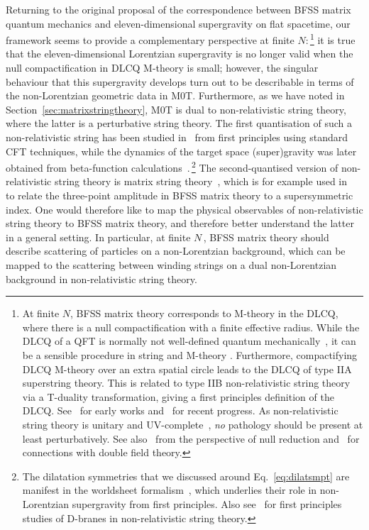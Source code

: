 \documentclass[11pt]{article}
\renewcommand{\emph}[1]{\textit{#1}}
\begin{document}
Returning to the original proposal of the correspondence between BFSS matrix quantum mechanics and eleven-dimensional supergravity on flat spacetime, our framework seems to provide a complementary perspective at finite $N$:\,\footnote{At finite $N$, BFSS matrix theory corresponds to M-theory in the DLCQ, where there is a null compactification with a finite effective radius. While the DLCQ of a QFT is normally not well-defined quantum mechanically~\cite{Hellerman:1997yu, Chapman:2020vtn}, it can be a sensible procedure in string and M-theory \cite{Seiberg:1997ad,Bilal:1998vq}. 
Furthermore, compactifying DLCQ M-theory over an extra spatial circle leads to the DLCQ of type IIA superstring theory. This is related to type IIB non-relativistic string theory via a T-duality transformation, giving a first principles definition of the DLCQ. See~\cite{Gomis:2000bd, Danielsson:2000gi} for early works and~\cite{Bergshoeff:2018yvt, Gomis:2020izd, Yan:2021hte} for recent progress. As non-relativistic string theory is unitary and UV-complete~\cite{Gomis:2000bd}, \emph{no} pathology should be present at least perturbatively. See also~\cite{Harmark:2017rpg, Kluson:2018egd,  Harmark:2018cdl, Harmark:2019upf} from the perspective of null reduction and~\cite{Ko:2015rha, Morand:2017fnv} for connections with double field theory.} it is true that the eleven-dimensional Lorentzian supergravity is no longer valid when the null compactification in DLCQ M-theory is small; however, the singular behaviour that this supergravity develops turn out to be describable in terms of the non-Lorentzian geometric data in M0T. Furthermore, as we have noted in Section~\ref{sec:matrixstringtheory}, M0T is dual to non-relativistic string theory, where the latter is a perturbative string theory. The first quantisation of such a non-relativistic string has been studied in~\cite{Gomis:2000bd} from first principles using standard CFT techniques, while the dynamics of the target space (super)gravity was later obtained from beta-function calculations~\cite{Gomis:2019zyu, Gallegos:2019icg, Bergshoeff:2019pij, Yan:2019xsf, Yan:2021lbe}.\,\footnote{The dilatation symmetries that we discussed around Eq.~\eqref{eq:dilatsmpt} are manifest in the worldsheet formalism~\cite{Bergshoeff:2018yvt, Bergshoeff:2021bmc}, which underlies their role in non-Lorentzian supergravity from first principles. Also see~\cite{Gomis:2020fui, Gomis:2020izd, Ebert:2021mfu} for first principles studies of D-branes in non-relativistic string theory.} The second-quantised version of non-relativistic string theory is matrix string theory~\cite{Motl:1997th, Dijkgraaf:1997vv}, which is for example used in~\cite{Herderschee:2023bnc} to relate the three-point amplitude in BFSS matrix theory to a supersymmetric index. One would therefore like to map the physical observables of non-relativistic string theory to BFSS matrix theory, and therefore better understand the latter in a general setting. In particular, at finite $N$\,, BFSS matrix theory should describe scattering of particles on a non-Lorentzian background, which can be mapped to the scattering between winding strings on a dual non-Lorentzian background in non-relativistic string theory. 
\end{document}
